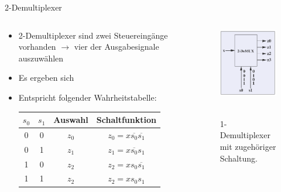 \documentclass[12pt%
,xcolor=table
,aspectratio=169%
]{beamer}
\begin{document}
\begin{frame}{2-Demultiplexer}
\begin{columns}[T] %
\begin{column}{.6\textwidth}
\begin{itemize}
		\item 2-Demultiplexer sind zwei Steuereingänge vorhanden $\to$ vier der Ausgabesignale auszuwählen
		\item Es ergeben sich
		\item Entspricht folgender Wahrheitstabelle:
		\begin{table}[]
\begin{tabular}{|c|c|cc|}
\hline
 \textbf{$s_0$}& \textbf{$s_1$}  & \textbf{Auswahl} & \textbf{Schaltfunktion} \\ \hline
0 & 0 & $z_0$ & $z_0 = x\overline{s_0} \overline{s_1}$  \\ \hline
0 & 1  & $z_1$ &  $z_1 = x\overline{s_0}s_1$ \\ \hline
1 & 0  & $z_2$ &  $z_2 = xs_0 \overline{s_1}$ \\ \hline
1 & 1  & $z_2$ &  $z_2 = xs_0 s_1$ \\ \hline
\end{tabular}
\end{table}
	\end{itemize}
\end{column}%
\hfill%
\begin{column}{.48\textwidth}
\centering
\begin{figure}
\includegraphics[scale=0.3]{pictures/demux2}\
\caption{1-Demultiplexer mit zugehöriger Schaltung.}
\end{figure}
\end{column}%
\end{columns}
\end{frame}
\end{document}
